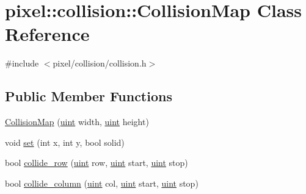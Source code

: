 \hypertarget{classpixel_1_1collision_1_1_collision_map}{}\section{pixel\+:\+:collision\+:\+:Collision\+Map Class Reference}
\label{classpixel_1_1collision_1_1_collision_map}


{\ttfamily \#include $<$pixel/collision/collision.\+h$>$}

\subsection*{Public Member Functions}
\begin{DoxyCompactItemize}
\item 
\hyperlink{classpixel_1_1collision_1_1_collision_map_ad4b43c70e9f33a560d2f9ed9f0a2455c}{Collision\+Map} (\hyperlink{namespacepixel_a6706355faabffaabebd430b2fa55843a}{uint} width, \hyperlink{namespacepixel_a6706355faabffaabebd430b2fa55843a}{uint} height)
\item 
void \hyperlink{classpixel_1_1collision_1_1_collision_map_a78d6d7d3fed586c7b6fa1ea83f28c9b6}{set} (int x, int y, bool solid)
\item 
bool \hyperlink{classpixel_1_1collision_1_1_collision_map_af2f5629a4500bba2d172964d740699b1}{collide\+\_\+row} (\hyperlink{namespacepixel_a6706355faabffaabebd430b2fa55843a}{uint} row, \hyperlink{namespacepixel_a6706355faabffaabebd430b2fa55843a}{uint} start, \hyperlink{namespacepixel_a6706355faabffaabebd430b2fa55843a}{uint} stop)
\item 
bool \hyperlink{classpixel_1_1collision_1_1_collision_map_a49a0a8ae03166393be6364a874f24de7}{collide\+\_\+column} (\hyperlink{namespacepixel_a6706355faabffaabebd430b2fa55843a}{uint} col, \hyperlink{namespacepixel_a6706355faabffaabebd430b2fa55843a}{uint} start, \hyperlink{namespacepixel_a6706355faabffaabebd430b2fa55843a}{uint} stop)
\end{DoxyCompactItemize}
